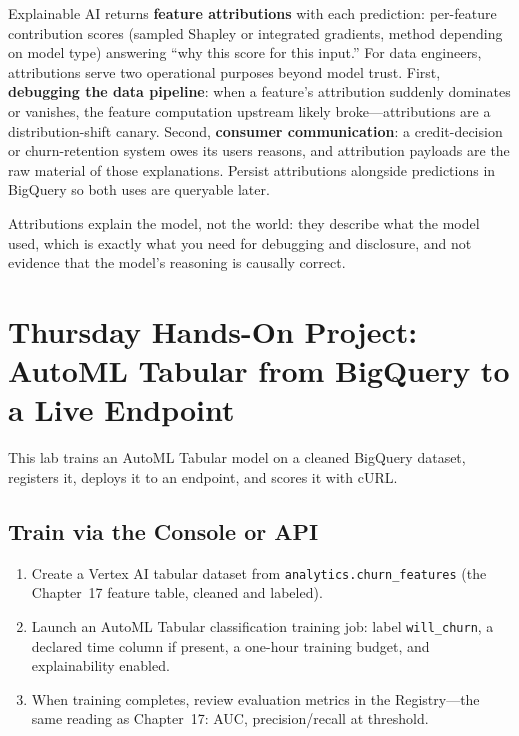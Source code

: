 Explainable AI returns \textbf{feature attributions} with each prediction: per-feature contribution scores (sampled Shapley or integrated gradients, method depending on model type) answering ``why this score for this input.'' For data engineers, attributions serve two operational purposes beyond model trust. First, \textbf{debugging the data pipeline}: when a feature's attribution suddenly dominates or vanishes, the feature computation upstream likely broke---attributions are a distribution-shift canary. Second, \textbf{consumer communication}: a credit-decision or churn-retention system owes its users reasons, and attribution payloads are the raw material of those explanations. Persist attributions alongside predictions in BigQuery so both uses are queryable later.

\begin{notebox}
Attributions explain the model, not the world: they describe what the model used, which is exactly what you need for debugging and disclosure, and not evidence that the model's reasoning is causally correct.
\end{notebox}

\section{Thursday Hands-On Project: AutoML Tabular from BigQuery to a Live Endpoint}
This lab trains an AutoML Tabular model on a cleaned BigQuery dataset, registers it, deploys it to an endpoint, and scores it with cURL.

\subsection{Train via the Console or API}
\begin{enumerate}
    \item Create a Vertex AI tabular dataset from \texttt{analytics.churn\_features} (the Chapter~17 feature table, cleaned and labeled).
    \item Launch an AutoML Tabular classification training job: label \texttt{will\_churn}, a declared time column if present, a one-hour training budget, and explainability enabled.
    \item When training completes, review evaluation metrics in the Registry---the same reading as Chapter~17: AUC, precision/recall at threshold.
\end{enumerate}


